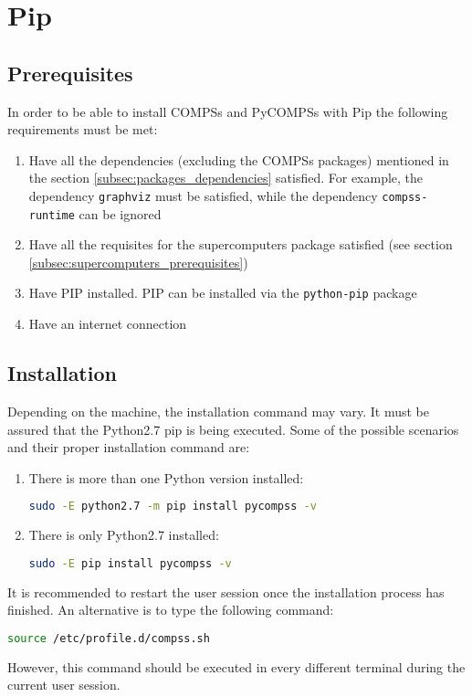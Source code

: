 \section{Pip}
\label{sec:Pip}

\subsection{Prerequisites}
\label{subsec:pip_prerequisites}
In order to be able to install COMPSs and PyCOMPSs with Pip the following requirements must be met:
\begin{enumerate}
 \item Have all the dependencies (excluding the COMPSs packages) mentioned in the section \ref{subsec:packages_dependencies} satisfied. For example, the dependency \verb|graphviz|
 must be satisfied, while the dependency \verb|compss-runtime| can be ignored
 \item Have all the requisites for the supercomputers package satisfied (see section \ref{subsec:supercomputers_prerequisites})
 \item Have PIP installed. PIP can be installed via the \verb|python-pip| package
 \item Have an internet connection
\end{enumerate}
\subsection{Installation}
\label{subsec:pip_installation}
Depending on the machine, the installation command may vary. It must be assured that the Python2.7 pip is being executed. Some of the possible scenarios and their proper installation command are:
\begin{enumerate}
 \item There is more than one Python version installed:
 \begin{lstlisting}[language=bash]
 sudo -E python2.7 -m pip install pycompss -v\end{lstlisting}
 \item There is only Python2.7 installed:
 \begin{lstlisting}[language=bash]
 sudo -E pip install pycompss -v \end{lstlisting}
\end{enumerate}
It is recommended to restart the user session once the installation process has finished. An alternative is to type the following command:
\begin{lstlisting}[language=bash]
source /etc/profile.d/compss.sh\end{lstlisting}
However, this command should be executed in every different terminal during the current user session.
